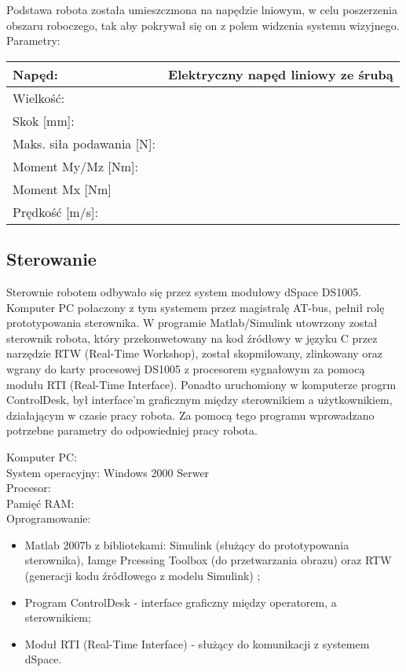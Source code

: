 \vspace{5mm}

Podstawa robota została umieszczmona na napędzie lniowym, w celu poszerzenia obszaru roboczego, tak aby pokrywał się on z polem widzenia systemu wizyjnego.\\
Parametry:\\
\begin{tabular}{|l|l|}\hline
Napęd: & Elektryczny napęd liniowy ze śrubą \\ \hline
Wielkość: & \\ \hline
Skok [mm]: & \\ \hline
Maks. siła podawania [N]: & \\ \hline
Moment My/Mz [Nm]: & \\ \hline
Moment Mx [Nm] & \\ \hline
Prędkość [m/s]: & \\ \hline
\end{tabular}
\subsection{Sterowanie}
Sterownie robotem odbywało się przez system modułowy dSpace DS1005. Komputer PC połaczony z tym systemem przez magistralę AT-bus, pełnił rolę prototypowania sterownika. W programie Matlab/Simulink utowrzony został sterownik robota, który przekonwetowany na kod źródłowy w języku C przez narzędzie RTW (Real-Time Workshop), został skopmilowany, zlinkowany oraz wgrany do karty procesowej DS1005 z procesorem sygnałowym za pomocą modułu RTI (Real-Time Interface). Ponadto uruchomiony w komputerze progrm ControlDesk, był interface'm graficznym  między sterownikiem a użytkownikiem, działającym w czasie pracy robota. Za pomocą tego programu wprowadzano potrzebne parametry do odpowiedniej pracy robota.


\noindent 
Komputer PC:\\
System operacyjny: Windows 2000 Serwer\\
Procesor:\\
Pamięć RAM:\\

\noindent Oprogramowanie:
\begin{itemize}
\item Matlab 2007b z bibliotekami: Simulink (służący do prototypowania sterownika), Iamge Prcessing Toolbox (do przetwarzania obrazu) oraz RTW (generacji kodu źródłowego z modelu Simulink) ;
\item Program ControlDesk - interface graficzny między operatorem, a sterownikiem;
\item Moduł RTI (Real-Time Interface) - służący do komunikacji z systemem dSpace.
\end{itemize}


